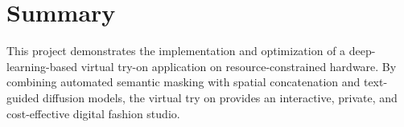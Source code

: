 \documentclass[12pt, a4paper]{report}
\begin{document}
\section{Summary}

This project demonstrates the implementation and optimization of a deep-learning-based virtual try-on application on resource-constrained hardware. By combining automated semantic masking with spatial concatenation and text-guided diffusion models, the virtual try on provides an interactive, private, and cost-effective digital fashion studio.


\renewcommand{\bibname}{References}
\end{document}
